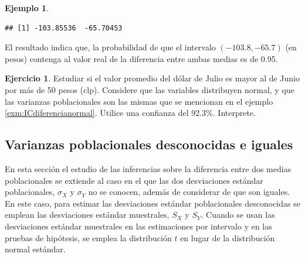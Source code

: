 \documentclass[
  11pt,
]{book}
\theoremstyle{definition}
\theoremstyle{definition}
\newtheorem{example}{Ejemplo}[chapter]
\theoremstyle{definition}
\newtheorem{exercise}{Ejercicio}[chapter]
\theoremstyle{definition}
\theoremstyle{remark}
\begin{document}
\begin{example}
\begin{verbatim}
## [1] -103.85536  -65.70453
\end{verbatim}

El resultado indica que, la probabilidad de que el intervalo \((-103.8,  -65.7)\) (en pesos) contenga al valor real de la diferencia entre ambas medias es de 0.95.
\end{example}

\begin{exercise}
Estudiar si el valor promedio del dólar de Julio es mayor al de Junio por más de 50 pesos (clp). Considere que las variables distribuyen normal, y que las varianzas poblacionales son las mismas que se mencionan en el ejemplo \ref{exm:ICdiferencianormal}. Utilice una confianza del 92.3\%. Interprete.
\end{exercise}

\subsection{Varianzas poblacionales desconocidas e iguales}\label{intervalo-de-confianza-para-la-diferencia-de-medias-varianzas-desconocidas-iguales}

En esta sección el estudio de las inferencias sobre la diferencia entre dos medias poblacionales se extiende al caso en el que las dos desviaciones estándar poblacionales, \(\sigma_X\) y \(\sigma_Y\) no se conocen, además de considerar de que son iguales. En este caso, para estimar las desviaciones estándar poblacionales desconocidas se emplean las desviaciones estándar muestrales, \(S_X\) y \(S_Y\). Cuando se usan las desviaciones estándar muestrales en las estimaciones por intervalo y en las pruebas de hipótesis, se emplea la distribución \(t\) en lugar de la distribución normal estándar.

\begin{table}[H]
\centering
\caption{\label{tab:unnamed-chunk-14}Intervalos de confianza para la diferencia de medias de dos distribucones normales y varianzas poblacionales desconocidas e iguales}
\centering
{}
\end{table}
\end{document}
